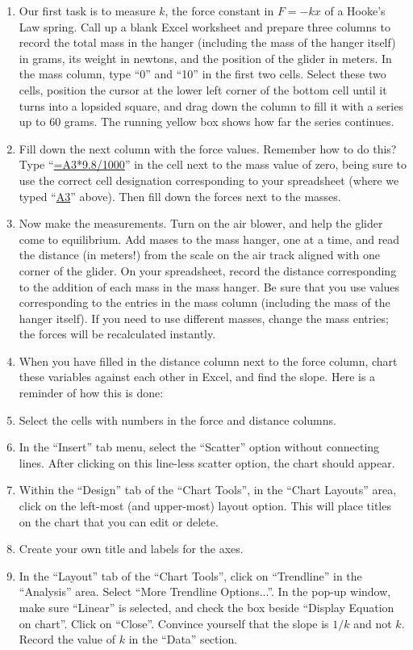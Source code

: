 \begin{enumerate}[label=\arabic*.]

\item Our first task is to measure \(k\), the force constant in \(F = -kx\) of a Hooke's Law spring.  Call up a blank Excel worksheet and prepare three columns to record the total mass in the hanger (including the mass of the hanger itself) in grams, its weight in newtons, and the position of the glider in meters.  In the mass column, type ``0'' and ``10'' in the first two cells.  Select these two cells, position the cursor at the lower left corner of the bottom cell until it turns into a lopsided square, and drag down the column to fill it with a series up to 60 grams.  The running yellow box shows how far the series continues.

\item Fill down the next column with the force values.  Remember how to do this?  Type ``\url{=A3*9.8/1000}'' in the cell next to the mass value of zero, being sure to use the correct cell designation corresponding to your spreadsheet (where we typed ``\url{A3}'' above).  Then fill down the forces next to the masses.

\item Now make the measurements.  Turn on the air blower, and help the glider come to equilibrium.  Add mases to the mass hanger, one at a time, and read the distance (in meters!) from the scale on the air track aligned with one corner of the glider.  On your spreadsheet, record the distance corresponding to the addition of each mass in the mass hanger.  Be sure that you use values corresponding to the entries in the mass column (including the mass of the hanger itself).  If you need to use different masses, change the mass entries; the forces will be recalculated instantly.

\item When you have filled in the distance column next to the force column, chart these variables against each other in Excel, and find the slope.  Here is a reminder of how this is done:
\squishlist
\item Select the cells with numbers in the force and distance columns.
\item In the ``Insert'' tab menu, select the ``Scatter'' option without connecting lines.  After clicking on this line-less scatter option, the chart should appear.
\item Within the ``Design'' tab of the ``Chart Tools'', in the ``Chart Layouts'' area, click on the left-most (and upper-most) layout option.  This will place titles on the chart that you can edit or delete.
\item Create your own title and labels for the axes.
\item In the ``Layout'' tab of the ``Chart Tools'', click on ``Trendline'' in the ``Analysis'' area.  Select ``More Trendline Options...''.  In the pop-up window, make sure ``Linear'' is selected, and check the box beside ``Display Equation on chart''.  Click on ``Close''.
\squishend
Convince yourself that the slope is \(1/k\) and not \(k\).  Record the value of \(k\) in the ``Data'' section.

\end{enumerate}

